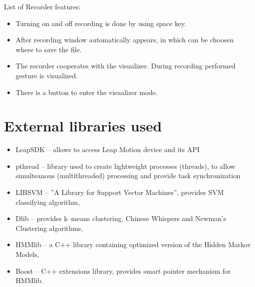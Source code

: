 List of Recorder features:
\begin{itemize}
\item Turning on and off recording is done by using space key.
\item After recording window automatically appears, in which can be choosen where to save the file.
\item The recorder cooperates with the visualizer. During recording performed gesture is visualized.
\item There is a button to enter the visualizer mode.
\end{itemize}

\section{External libraries used} \label{librariesSection}

\begin{itemize} 
\item LeapSDK -- allows to access Leap Motion device and its API
\item pthread -- library used to create lightweight processes (threads), to allow simulteanous (multithreaded) processing and provide task synchronization
\item LIBSVM -- ''A Library for Support Vector Machines'', provides SVM classifying algorithm,
\item Dlib -- provides k--means clustering, Chinese Whispers and Newman's Clustering algorithms,
\item HMMlib -- a C++ library containing optimized version of the Hidden Markov Models,
\item Boost -- C++ extensions library, provides smart pointer mechanism for HMMlib.
\end{itemize}
